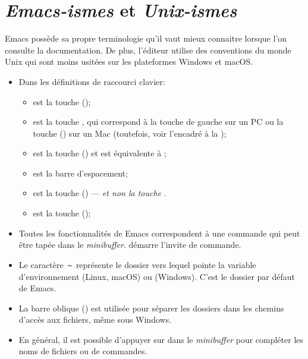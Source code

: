 \section{\emph{Emacs-ismes} et \emph{Unix-ismes}}
\label{sec:emacs+ess:ismes}

Emacs possède sa propre terminologie qu'il vaut mieux connaitre
lorsque l'on consulte la documentation. De plus, l'éditeur utilise des
conventions du monde Unix qui sont moins usitées sur les plateformes
Windows et macOS.

\begin{itemize}
\item Dans les définitions de raccourci clavier:
  \begin{itemize}
  \item {} est la touche  (\ctlkey);
  \item {} est la touche , qui correspond à la touche
     de gauche sur un PC ou la touche 
    (\optkey) sur un Mac (toutefois, voir l'encadré à la
    );
  \item {} est la touche  (\esckey) et
    est équivalente à ;
  \item {} est la barre d'espacement;
  \item {} est la touche  (\delkey) ---
    \emph{et non la touche} .
  \item {} est la touche  (\returnkey);
  \end{itemize}
\item Toutes les fonctionnalités de Emacs correspondent à une commande
  qui peut être tapée dans le \emph{minibuffer}.  démarre
  l'invite de commande.
\item Le caractère \,\verb=~=\, représente le dossier vers lequel
  pointe la variable d'environnement  (Linux, macOS) ou
   (Windows). C'est le dossier par défaut de Emacs.
\item La barre oblique (\code{/}) est utilisée pour séparer les
  dossiers dans les chemins d'accès aux fichiers, même sous Windows.
\item En général, il est possible d'appuyer sur  dans le
  \emph{minibuffer} pour compléter les noms de fichiers ou de
  commandes.
\end{itemize}

